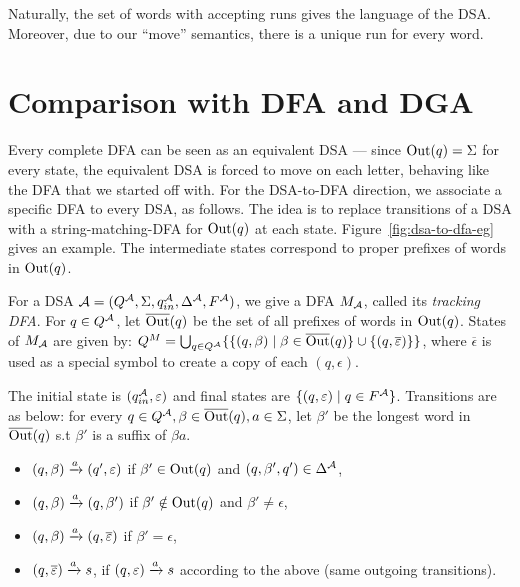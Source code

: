 Naturally, the set of words with accepting runs gives the
language of the DSA. Moreover, due to our ``move'' semantics, there is
a unique run for every word.



\section{Comparison with DFA and DGA}
\label{sec:comparison-with-dfa}

Every complete DFA can be seen as an equivalent DSA --- since
$\operatorname{Out}(q) = \Sigma$ for every state, the equivalent DSA is forced to
move on each letter, behaving like the DFA that we started off
with. For the DSA-to-DFA direction, we associate a specific DFA to
every DSA, as follows. The idea is to replace transitions of a DSA
with a string-matching-DFA for $\operatorname{Out}(q)$ at each
state. Figure~\ref{fig:dsa-to-dfa-eg} gives an example. The
intermediate states correspond to proper prefixes of words in
$\operatorname{Out}(q)$.




\begin{definition}\label{def:tracking-dfa}
  For a DSA $\mathcal{A} = (Q^{\mathcal{A}}, \Sigma, q_{in}^{\mathcal{A}}, \Delta^{\mathcal{A}}, F^{\mathcal{A}})$, we
  give a DFA $M_{\mathcal{A}}$, called its \emph{tracking DFA}. For
  $q \in Q^{\mathcal{A}}$, let $\overline{\operatorname{Out}}(q)$ be the set of all prefixes of words in
  $\operatorname{Out}(q)$.  States of $M_{\mathcal{A}}$ are given by:
  $Q^M = \bigcup_{q \in Q^{\mathcal{A}}} \{ \{ (q, \beta) \mid \beta \in \overline{\operatorname{Out}}(q)\} \cup
  \{(q,\overline{\varepsilon})\} \}$, where $\overline{\epsilon}$ is used as a special symbol to create a copy of each $(q,\epsilon)$. 

  The initial state is $(q^{\mathcal{A}}_{in}, \varepsilon)$ and final states are
  $\{ (q, \varepsilon) \mid q \in F^{\mathcal{A}}\}$. Transitions are as below: for
  every $q \in Q^{\mathcal{A}}, \beta \in \overline{\operatorname{Out}}(q), a \in \Sigma$, let $\beta'$ be the
  longest word in $\overline{\operatorname{Out}}(q)$ s.t $\beta'$ is a suffix of $\beta
  a$. 
  \begin{itemize}
  \item $(q, \beta) \xrightarrow{a} (q', \varepsilon)$ if $\beta' \in \operatorname{Out}(q)$ and  
    $(q,\beta', q') \in \Delta^{\mathcal{A}}$, 
  \item $(q, \beta) \xrightarrow{a} (q, \beta')$ if $\beta' \notin \operatorname{Out}(q)$ and
    $\beta' \neq \epsilon$,
  \item $(q, \beta) \xrightarrow{a} (q,\overline{\varepsilon})$ if $\beta' = \epsilon$,
  \item $(q,\overline{\varepsilon}) \xrightarrow{a} s$, if $(q, \varepsilon) \xrightarrow{a} s$ according
    to the above (same outgoing transitions).
  \end{itemize}

\end{definition}


